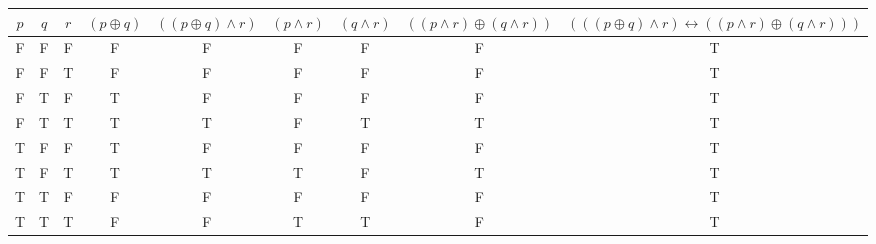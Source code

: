 \begin{tabular}{|c|c|c||c|c|c|c|c|c|}
\hline
$ p $ & $ q $ & $ r $ & $ (p \oplus q) $ & $ ((p \oplus q) \wedge r) $ & $ (p \wedge r) $ & $ (q \wedge r) $ & $ ((p \wedge r) \oplus (q \wedge r)) $ & $ (((p \oplus q) \wedge r) \leftrightarrow ((p \wedge r) \oplus (q \wedge r))) $ \\
\hline
F & F & F & F & F & F & F & F & T \\
F & F & T & F & F & F & F & F & T \\
F & T & F & T & F & F & F & F & T \\
F & T & T & T & T & F & T & T & T \\
T & F & F & T & F & F & F & F & T \\
T & F & T & T & T & T & F & T & T \\
T & T & F & F & F & F & F & F & T \\
T & T & T & F & F & T & T & F & T \\
\hline
\end{tabular}
